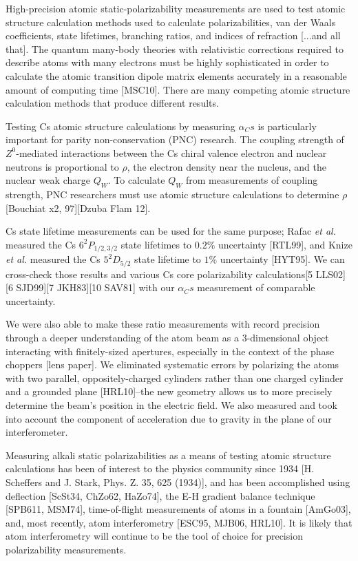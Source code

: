 \documentclass[12pt,letterpaper]{article}
\begin{document}
High-precision atomic static-polarizability measurements are used to test atomic structure calculation methods used to calculate polarizabilities, van der Waals coefficients, state lifetimes, branching ratios, and indices of refraction [...and all that]. The quantum many-body theories with relativistic corrections required to describe atoms with many electrons must be highly sophisticated in order to calculate the atomic transition dipole matrix elements accurately in a reasonable amount of computing time [MSC10]. There are many competing atomic structure calculation methods that produce different results.

Testing Cs atomic structure calculations by measuring $\alpha_Cs$ is particularly important for parity non-conservation (PNC) research. The coupling strength of $Z^0$-mediated interactions between the Cs chiral valence electron and nuclear neutrons is proportional to $\rho$, the electron density near the nucleus, and the nuclear weak charge $Q_W$. To calculate $Q_W$ from measurements of coupling strength, PNC researchers must use atomic structure calculations to determine $\rho$ [Bouchiat x2, 97][Dzuba Flam 12]. 

Cs state lifetime measurements can be used for the same purpose; Rafac \textit{et al.} measured the Cs $6^2P_{1/2,3/2}$ state lifetimes to $0.2\%$ uncertainty [RTL99], and Knize \textit{et al.} measured the Cs $5^2D_{5/2}$ state lifetime to $1\%$ uncertainty [HYT95]. We can cross-check those results and various Cs core polarizability calculations[5 LLS02][6 SJD99][7 JKH83][10 SAV81] with our $\alpha_Cs$ measurement of comparable uncertainty. 

We were also able to make these ratio measurements with record precision through a deeper understanding of the atom beam as a 3-dimensional object interacting with finitely-sized apertures, especially in the context of the phase choppers [lens paper]. We eliminated systematic errors by polarizing the atoms with two parallel, oppositely-charged cylinders rather than one charged cylinder and a grounded plane [HRL10]--the new geometry allows us to more precisely determine the beam's position in the electric field.
We also measured and took into account the component of acceleration due to gravity in the plane of our interferometer.

Measuring alkali static polarizabilities as a means of testing atomic 
structure calculations has been of interest to the physics community since
1934 [H. Scheffers and J. Stark, Phys. Z. 35, 625 (1934)], and has been
accomplished using deflection [ScSt34, ChZo62, HaZo74], the E-H gradient
balance technique [SPB611, MSM74], time-of-flight measurements of atoms
in a fountain [AmGo03], and, most recently, atom interferometry 
[ESC95, MJB06, HRL10]. It is likely that atom interferometry will continue to be the tool of choice for precision polarizability measurements.
\end{document}
